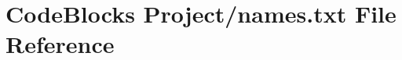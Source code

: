 \hypertarget{CodeBlocks_01Project_2names_8txt}{}\section{Code\+Blocks Project/names.txt File Reference}
\label{CodeBlocks_01Project_2names_8txt}

